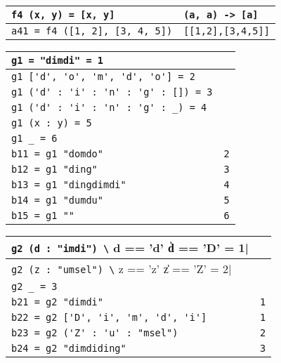 \begin{tabularx}{\linewidth}{|l|X|}
  \hline
  \lstinline|f4 (x, y) = [x, y]| & \lstinline|(a, a) -> [a]|\\
  \hline
  \lstinline|a41 = f4 ([1, 2], [3, 4, 5])| & \lstinline|[[1,2],[3,4,5]]|\\
  \hline
\end{tabularx}
\begin{tabularx}{\linewidth}{|l|X|}
  \hline
  \lstinline|g1 = "dimdi" = 1| & \\
  \hline
  \lstinline|g1 ['d', 'o', 'm', 'd', 'o'] = 2| & \\
  \hline
  \lstinline|g1 ('d' : 'i' : 'n' : 'g' : []) = 3| & \\
  \hline
  \lstinline|g1 ('d' : 'i' : 'n' : 'g' : _) = 4| & \\
  \hline
  \lstinline|g1 (x : y) = 5| & \\
  \hline
  \lstinline|g1 _ = 6| & \\
  \hline
  \lstinline|b11 = g1 "domdo"| & \lstinline|2|\\
  \hline
  \lstinline|b12 = g1 "ding"| & \lstinline|3|\\
  \hline
  \lstinline|b13 = g1 "dingdimdi"| & \lstinline|4|\\
  \hline
  \lstinline|b14 = g1 "dumdu"| & \lstinline|5|\\
  \hline
  \lstinline|b15 = g1 ""| & \lstinline|6|\\
  \hline
\end{tabularx}
\begin{tabularx}{\linewidth}{|l|X|}
  \hline
  \lstinline|g2 (d : "imdi") \| d == 'd' \|\| d == 'D' = 1| & \\%
  \hline
  \lstinline|g2 (z : "umsel") \| z == 'z' \|\| z == 'Z' = 2| & \\%
  \hline
  \lstinline|g2 _ = 3| & \\
  \hline
  \lstinline|b21 = g2 "dimdi"| & \lstinline|1|\\
  \hline
  \lstinline|b22 = g2 ['D', 'i', 'm', 'd', 'i']| & \lstinline|1|\\
  \hline
  \lstinline|b23 = g2 ('Z' : 'u' : "msel")| & \lstinline|2|\\
  \hline
  \lstinline|b24 = g2 "dimdiding"| & \lstinline|3|\\
  \hline
\end{tabularx}
